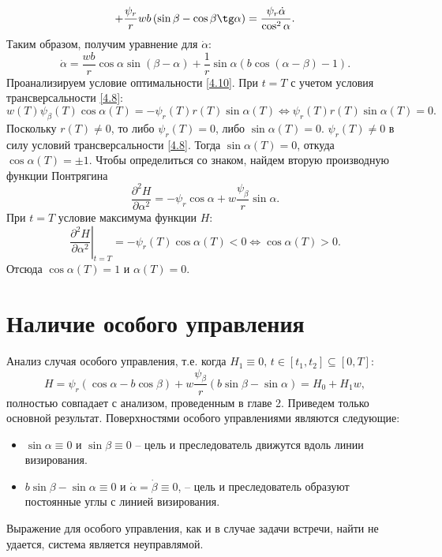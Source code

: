 \documentclass[a4paper,12pt, openany]{book}
\theoremstyle{plain} %
\theoremstyle{definition} %
\theoremstyle{remark} %
\numberwithin{equation}{chapter}
\begin{document}
{\begin{multline*}
 + \frac{{\psi _r }}{r}wb\left( {\sin \beta  - \cos \beta \tg\alpha } \right) = \frac{{\psi _r \dot \alpha }}{{\cos ^2 \alpha }}.
\end{multline*}
Таким образом, получим уравнение для $\dot\alpha$: \begin{equation}\label{4.13}
\dot \alpha  = \frac{{wb}}{r}\cos \alpha \sin \left( {\beta  - \alpha } \right) + \frac{1}{r}\sin \alpha \left( {b\cos \left( {\alpha  - \beta } \right) - 1} \right).
\end{equation}
Проанализируем условие оптимальности \eqref{4.10}. При $t=T$ с учетом условия трансверсальности \eqref{4.8}:
\[
w\left( T \right)\psi _\beta  \left( T \right)\cos \alpha \left( T \right) =  - \psi _r \left( T \right)r\left( T \right)\sin \alpha \left( T \right) \Longleftrightarrow \psi _r \left( T \right)r\left( T \right)\sin \alpha \left( T \right) = 0.
\]
Поскольку $r(T) \neq 0$, то либо $\psi_r(T) = 0$, либо $\sin\alpha(T) = 0$. $\psi_r(T) \neq 0$ в силу условий трансверсальности \eqref{4.8}.
 Тогда $\sin\alpha(T) = 0$, откуда $\cos\alpha(T) = \pm 1$. Чтобы определиться со знаком, найдем вторую производную функции Понтрягина
\[
\frac{{\partial ^2 H}}{{\partial \alpha ^2 }} =  - \psi _r \cos \alpha  + w\frac{{\psi _\beta  }}{r}\sin \alpha .
\]
При $t=T$ условие максимума функции $H$:
\[
\left. {\frac{{\partial ^2 H}}{{\partial \alpha ^2 }}} \right|_{t = T}  =  - \psi _r \left( T \right)\cos \alpha \left( T \right) < 0 \Longleftrightarrow \cos \alpha \left( T \right) > 0.
\]
Отсюда $\cos\alpha(T) = 1$ и $\alpha(T) = 0$.
\newpage
\section{Наличие особого управления}

Анализ случая особого управления, т.е. когда $H_1 \equiv 0,\, t\in [t_1,t_2] \subseteq [0,T]$:
\begin{equation}\label{4.14}
H = \psi _r \left( {\cos \alpha  - b\cos \beta } \right) + w\frac{{\psi _\beta  }}{r}\left( {b\sin \beta  - \sin \alpha } \right) = H_0  + H_1 w,
\end{equation}
полностью совпадает с анализом, проведенным в главе 2. Приведем только основной результат. Поверхностями особого управлениями являются следующие:
\begin{itemize} 
\item $\sin\alpha \equiv 0$ и $\sin\beta \equiv 0$ -- цель и преследователь движутся вдоль линии визирования.
\item $b\sin\beta - \sin\alpha \equiv 0$ и $\dot\alpha = \dot\beta \equiv 0$, -- цель и преследователь образуют постоянные углы с линией визирования.
\end{itemize} 
Выражение для особого управления, как и в случае задачи встречи, найти не удается, система является неуправлямой.

}
\end{document}
